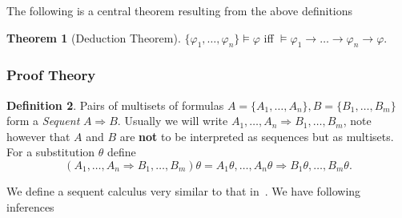 \documentclass[onehalfspacing]{article}
\theoremstyle{definition}
\newtheorem{theorem}{Theorem}[section]
\theoremstyle{definition}
\theoremstyle{definition}
\theoremstyle{definition}
\theoremstyle{definition}
\newtheorem{definition}[theorem]{Definition}
\theoremstyle{definition}
\begin{document}
The following is a central theorem resulting from the above definitions

\begin{theorem}[Deduction Theorem]
$\{\varphi_1,\dots,\varphi_n\}\models\varphi$ iff $\models \varphi_1\to\dots\to\varphi_n\to\varphi$.
\end{theorem}


\subsubsection{Proof Theory}
\begin{definition}
   Pairs of multisets of formulas $A = \{A_1,\dots, A_n\}, B = \{B_1,\dots, B_m\}$ form a \textit{Sequent} $A\Rightarrow B$. Usually we will write $A_1,\dots, A_n\Rightarrow B_1,\dots, B_m$, note however that $A$ and $B$ are \textbf{not} to be interpreted as sequences but as multisets. For a substitution $\theta$ define $$(A_1,\dots, A_n\Rightarrow B_1,\dots, B_m)\theta = A_1\theta,\dots, A_n\theta\Rightarrow B_1\theta,\dots, B_m\theta.$$
\end{definition}

We define a sequent calculus very similar to that in~\cite[p.77]{basicprooftheory}. We have following inferences\\
\end{document}
